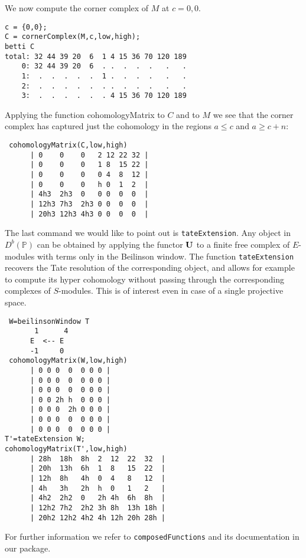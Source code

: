 \documentclass[twoside,12pt, leqno]{amsart}
\def\PP{{\mathbb P}}
\def\bU{{\bf U}}
\begin{document}
{\noindent
We now compute the corner complex of $M$ at $c={0,0}$.
{\small \begin{verbatim}
c = {0,0};
C = cornerComplex(M,c,low,high);
betti C
total: 32 44 39 20  6  1 4 15 36 70 120 189
    0: 32 44 39 20  6  . .  .  .  .   .   .
    1:  .  .  .  .  .  1 .  .  .  .   .   .
    2:  .  .  .  .  .  . .  .  .  .   .   .
    3:  .  .  .  .  .  . 4 15 36 70 120 189
\end{verbatim}
Applying the function cohomologyMatrix to $C$ and to $M$ 
we see that the corner complex has captured just the
cohomology in the regions $a\leq c$ and $a\geq c+n$:
\begin{verbatim}
 cohomologyMatrix(C,low,high)
      | 0    0    0   2 12 22 32 |
      | 0    0    0   1 8  15 22 |
      | 0    0    0   0 4  8  12 |
      | 0    0    0   h 0  1  2  |
      | 4h3  2h3  0   0 0  0  0  |
      | 12h3 7h3  2h3 0 0  0  0  |
      | 20h3 12h3 4h3 0 0  0  0  |
\end{verbatim}}

The last command we would like to point out is {\tt tateExtension}. Any object in $D^b(\PP)$ can be obtained by applying the functor $\bU$ to a finite free complex of $E$-modules with terms only in the Beilinson window. The function {\tt tateExtension} recovers the Tate resolution of the corresponding object,  and allows for example to compute its hyper cohomology without passing through the corresponding complexes of $S$-modules. This is of interest even in case of a single projective space. 
{\small \begin{verbatim}
 W=beilinsonWindow T
       1      4
      E  <-- E              
      -1     0
 cohomologyMatrix(W,low,high)
      | 0 0 0  0  0 0 0 |
      | 0 0 0  0  0 0 0 |
      | 0 0 0  0  0 0 0 |
      | 0 0 2h h  0 0 0 |
      | 0 0 0  2h 0 0 0 |
      | 0 0 0  0  0 0 0 |
      | 0 0 0  0  0 0 0 |
T'=tateExtension W; 
cohomologyMatrix(T',low,high) 
      | 28h  18h  8h  2  12  22  32  |
      | 20h  13h  6h  1  8   15  22  |
      | 12h  8h   4h  0  4   8   12  |
      | 4h   3h   2h  h  0   1   2   |
      | 4h2  2h2  0   2h 4h  6h  8h  |
      | 12h2 7h2  2h2 3h 8h  13h 18h |
      | 20h2 12h2 4h2 4h 12h 20h 28h |
\end{verbatim}}
\noindent
For further information we refer to  {\tt composedFunctions} and its documentation in our package.
%
%


}
\end{document}
